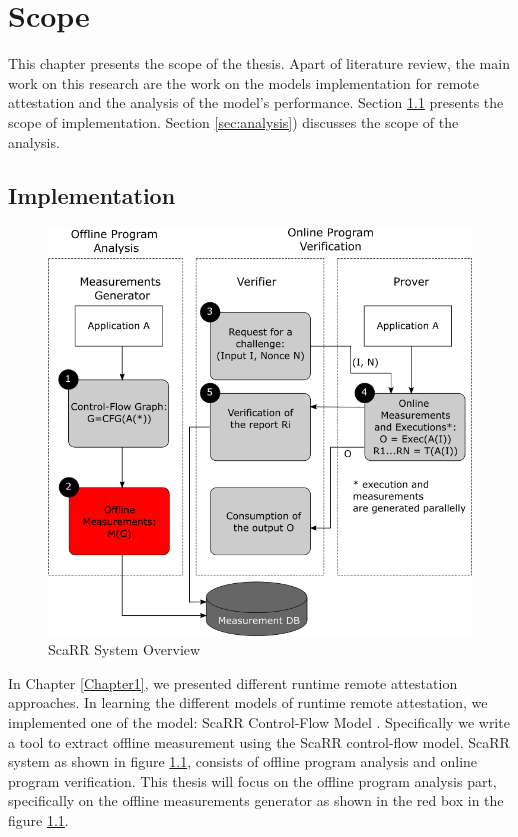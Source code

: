 
\chapter{Scope} %
\label{Chapter2} %

This chapter presents the scope of the thesis. Apart of literature review, the
main work on this research are the work on the models implementation for remote
attestation and the analysis of the model's performance. Section
\ref{sec:implementation} presents the scope of implementation. Section
\ref{sec:analysis}) discusses the scope of the analysis.

\section{Implementation}
\label{sec:implementation}

\begin{figure}[htbp]
\centerline{\includegraphics[scale=.5]{Figures/02/scarr-system-overview.png}}
\caption{ScaRR System Overview}
\label{fig:scarr-system-overview}
\end{figure}

In Chapter \ref{Chapter1}, we presented different runtime remote attestation
approaches. In learning the different models of runtime remote attestation, we
implemented one of the model: ScaRR Control-Flow Model
\cite{toffaliniScaRRScalableRuntime2019}. Specifically we write a tool to
extract offline measurement using the ScaRR control-flow model. ScaRR system as
shown in figure \ref{fig:scarr-system-overview}, consists of offline program
analysis and online program verification. This thesis will focus on the offline
program analysis part, specifically on the offline measurements generator as
shown in the red box in the figure \ref{fig:scarr-system-overview}.

